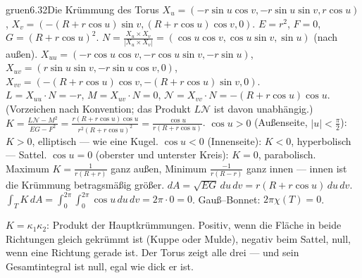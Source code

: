 \begin{loesungkarte}{gruen}{6.32}{Die Krümmung des Torus}
$X_u = (-r\sin u\cos v, -r\sin u\sin v, r\cos u)$, $X_v = (-(R + r\cos u)\sin v, (R + r\cos u)\cos v, 0)$. $E = r^{2}$, $F = 0$, $G = (R + r\cos u)^{2}$.
$N = \frac{X_u\times X_v}{|X_u\times X_v|} = (\cos u\cos v, \cos u\sin v, \sin u)$ (nach außen). $X_{uu} = (-r\cos u\cos v, -r\cos u\sin v, -r\sin u)$, $X_{uv} = (r\sin u\sin v, -r\sin u\cos v, 0)$, $X_{vv} = (-(R + r\cos u)\cos v, -(R + r\cos u)\sin v, 0)$. \\
$L = X_{uu}\cdot N = -r$, $M = X_{uv}\cdot N = 0$, $\mathcal N = X_{vv}\cdot N = -(R + r\cos u)\cos u$. (Vorzeichen nach Konvention; das Produkt $L\mathcal N$ ist davon unabhängig.)
$K = \frac{L\mathcal N - M^{2}}{EG - F^{2}} = \frac{r(R + r\cos u)\cos u}{r^{2}(R + r\cos u)^{2}} = \frac{\cos u}{r(R + r\cos u)}$.
$\cos u > 0$ (Außenseite, $|u| < \frac\pi2$): $K > 0$, elliptisch --- wie eine Kugel. $\cos u < 0$ (Innenseite): $K < 0$, hyperbolisch --- Sattel. $\cos u = 0$ (oberster und unterster Kreis): $K = 0$, parabolisch. Maximum $K = \frac1{r(R + r)}$ ganz außen, Minimum $\frac{-1}{r(R - r)}$ ganz innen --- innen ist die Krümmung betragsmäßig größer.
$dA = \sqrt{EG}\,du\,dv = r(R + r\cos u)\,du\,dv$. $\int_TK\,dA = \int_0^{2\pi}\!\!\int_0^{2\pi}\cos u\,du\,dv = 2\pi\cdot0 = 0$. Gauß--Bonnet: $2\pi\chi(T) = 0$. \checkmark
{}
\begin{mitnehmen}\kastentext
$K = \kappa_1\kappa_2$: Produkt der Hauptkrümmungen. Positiv, wenn die Fläche in beide Richtungen gleich gekrümmt ist (Kuppe oder Mulde), negativ beim Sattel, null, wenn eine Richtung gerade ist. Der Torus zeigt alle drei --- und sein Gesamtintegral ist null, egal wie dick er ist.
\end{mitnehmen}
\end{loesungkarte}

